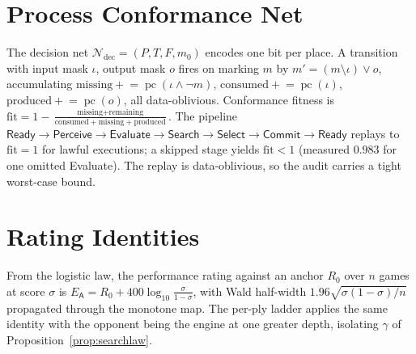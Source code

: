 \documentclass[11pt,oneside]{book}
\theoremstyle{definition}
\theoremstyle{plain}
\theoremstyle{remark}
\newcommand{\Elo}{E}
\newcommand{\Engine}{\mathsf{A}}
\newcommand{\score}{\sigma}
\newcommand{\popc}{\operatorname{pc}}
\newcommand{\fit}{\mathrm{fit}}
\begin{document}
\chapter{Process Conformance Net}\label{ch:conformance}
The decision net $\mathcal{N}_{\mathrm{dec}}=(P,T,F,m_0)$ encodes one bit per place. A
transition with input mask $\iota$, output mask $o$ fires on marking $m$ by
$m'=(m\setminus\iota)\vee o$, accumulating
$\text{missing}\mathrel{+}=\popc(\iota\wedge\neg m)$,
$\text{consumed}\mathrel{+}=\popc(\iota)$, $\text{produced}\mathrel{+}=\popc(o)$, all
data-oblivious. Conformance fitness is
$\fit=1-\frac{\text{missing}+\text{remaining}}{\text{consumed}+\text{missing}+\text{produced}}$.
The pipeline
$\textsf{Ready}\to\textsf{Perceive}\to\textsf{Evaluate}\to\textsf{Search}\to\textsf{Select}
\to\textsf{Commit}\to\textsf{Ready}$ replays to $\fit=1$ for lawful executions; a skipped
stage yields $\fit<1$ (measured $0.983$ for one omitted \textsf{Evaluate}). The replay is
data-oblivious, so the audit carries a tight worst-case bound.

\chapter{Rating Identities}
From the logistic law, the performance rating against an anchor $R_0$ over $n$ games at
score $\score$ is $\Elo_\Engine=R_0+400\log_{10}\frac{\score}{1-\score}$, with Wald
half-width $1.96\sqrt{\score(1-\score)/n}$ propagated through the monotone map. The per-ply
ladder applies the same identity with the opponent being the engine at one greater depth,
isolating $\gamma$ of Proposition~\ref{prop:searchlaw}.
\end{document}

